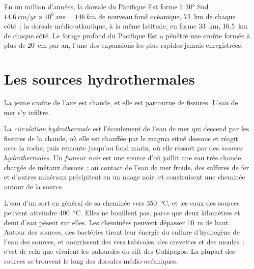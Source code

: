 \begin{example}\label{ex:g11:ocean-ridges:rates}
En un million d'années, la dorsale du Pacifique Est forme à \ang{30} Sud
$\qty{14.6}{cm/yr} \times 10^6\ \text{ans} = \qty{146}{km}$ de nouveau fond
océanique, \qty{73}{km} de chaque côté~; la dorsale médio-atlantique, à la
même latitude, en forme \qty{33}{km}, \qty{16.5}{km} de chaque côté. Le
forage profond du Pacifique Est a pénétré une croûte formée à plus de
\qty{20}{cm} par an, l'une des expansions les plus rapides jamais
enregistrées.
\end{example}

\section{Les sources hydrothermales}

La jeune croûte de l'axe est chaude, et elle est parcourue de fissures.
L'eau de mer s'y infiltre.

\begin{definition}\label{def:g11:ocean-ridges:hydrothermal}
La \emph{circulation hydrothermale} est
l'écoulement de l'eau de mer qui descend par les fissures de la  chaude, où elle est chauffée par le magma situé dessous et réagit
avec la roche, puis remonte jusqu'au fond marin, où elle ressort par des
\emph{sources hydrothermales}. Un \emph{fumeur noir} est
une source d'où jaillit une eau très chaude chargée de métaux dissous~; au
contact de l'eau de mer froide, des sulfures de fer et d'autres minéraux
précipitent en un nuage noir, et construisent une cheminée autour de la
source.
\end{definition}

L'eau d'un  sort en général de sa cheminée vers
\qty{350}{\celsius}, et les eaux des sources peuvent atteindre
\qty{400}{\celsius}. Elles ne bouillent pas, parce que deux kilomètres et
demi d'eau pèsent sur elles. Les cheminées peuvent dépasser \qty{10}{m} de
haut. Autour des sources, des bactéries tirent leur énergie du sulfure
d'hydrogène de l'eau des sources, et nourrissent des vers tubicoles, des
crevettes et des moules~: c'est de cela que vivaient les palourdes du rift
des Galápagos. La plupart des sources se trouvent le long des dorsales
médio-océaniques.

